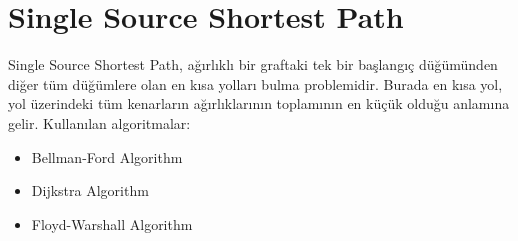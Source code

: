 \section{Single Source Shortest Path}

Single Source Shortest Path, ağırlıklı bir graftaki tek bir başlangıç düğümünden diğer tüm düğümlere olan en kısa yolları bulma problemidir. Burada en kısa yol, yol üzerindeki tüm kenarların ağırlıklarının toplamının en küçük olduğu anlamına gelir. Kullanılan algoritmalar:

\begin{itemize}
    \item Bellman-Ford Algorithm
    \item Dijkstra Algorithm
    \item Floyd-Warshall Algorithm
\end{itemize}

\newpage